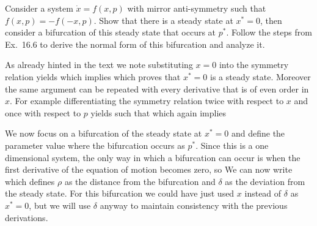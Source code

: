Consider a system $\dot{x}=f(x,p)$ with mirror anti-symmetry such that $f(x,p)=-f(-x,p)$. Show that there is a steady state at $x^*=0$, then consider a bifurcation of this steady state that occurs at $p^*$. Follow the steps from Ex.~16.6 to derive the normal form of this bifurcation and analyze it.   

\solution
As already hinted in the text we note substituting $x=0$ into the symmetry relation yields 
which implies
which proves that $x^*=0$ is a steady state. Moreover the same argument can be repeated with every derivative that is of even order in $x$. For example differentiating the symmetry relation twice with respect to $x$ and once with respect to $p$ yields 
such that 
which again implies 

We now focus on a bifurcation of the steady state at $x^*=0$ and define the parameter value where the bifurcation occurs as $p^*$. Since this is a one dimensional system, the only way in which a bifurcation can occur is when the first derivative of the equation of motion becomes zero, so 
We can now write 
which defines $\rho$ as the distance from the bifurcation and $\delta$ as the deviation from the steady state. For this bifurcation we could have just used $x$ instead of $\delta$ as $x^*=0$, but we will use $\delta$ anyway to maintain consistency with the previous derivations.

